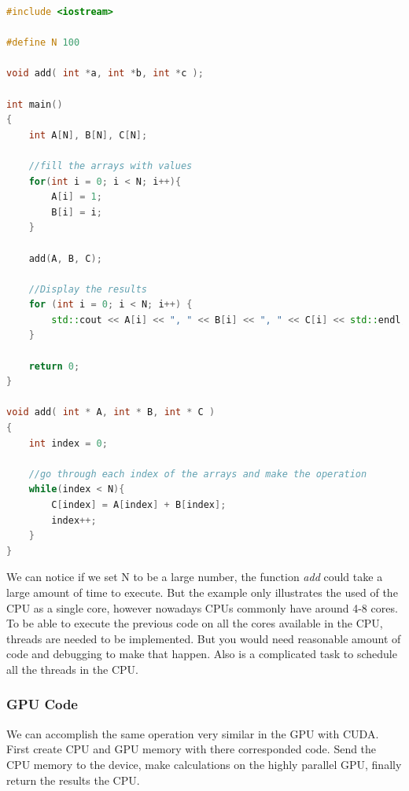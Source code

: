 \begin{lstlisting}[language=C++, caption={CPU Vector Addition}]
#include <iostream>

#define N 100

void add( int *a, int *b, int *c );

int main()
{
    int A[N], B[N], C[N];
    
    //fill the arrays with values
    for(int i = 0; i < N; i++){
        A[i] = 1;
        B[i] = i;
    }
    
    add(A, B, C);
    
    //Display the results
    for (int i = 0; i < N; i++) {
        std::cout << A[i] << ", " << B[i] << ", " << C[i] << std::endl;
    }
    
    return 0;
}

void add( int * A, int * B, int * C )
{
    int index = 0;
    
    //go through each index of the arrays and make the operation
    while(index < N){
        C[index] = A[index] + B[index];
        index++;
    }
}

\end{lstlisting}

We can notice if we set N to be a large number, the function \textit{add} could take a large amount of time to execute. But the example only illustrates the used of the CPU as a single core, however nowadays CPUs commonly have around 4-8 cores. To be able to execute the previous code on all the cores available in the CPU, threads are needed to be implemented. But you would need reasonable amount of code and debugging to make that happen. Also is a complicated task to schedule all the threads in the CPU. 

\subsubsection{GPU Code}

We can accomplish the same operation very similar in the GPU with CUDA. First create CPU and GPU memory with there corresponded code. Send the CPU memory to the device, make calculations on the highly parallel GPU, finally return the results the CPU.


